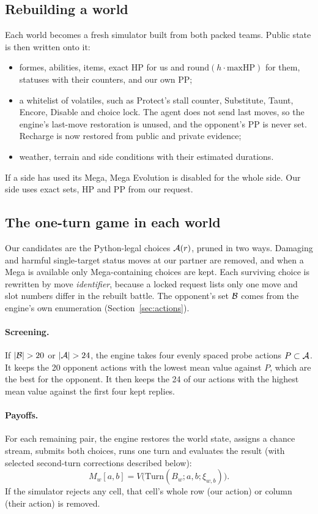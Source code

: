 \subsection{Rebuilding a world}
Each world becomes a fresh simulator  built from both packed
teams. Public state is then written onto it:
\begin{itemize}
  \item formes, abilities, items, exact HP for us and $\mathrm{round}(h\cdot
    \mathrm{maxHP})$ for them, statuses with their counters, and our own PP;
  \item a whitelist of volatiles, such as Protect's stall counter, Substitute,
    Taunt, Encore, Disable and choice lock. The agent does not send last
    moves, so the engine's last-move restoration is unused, and the opponent's
    PP is never set. Recharge is now restored from public and private evidence;
  \item weather, terrain and side conditions with their estimated durations.
\end{itemize}
If a side has used its Mega, Mega Evolution is disabled for the whole side.
Our side uses exact sets, HP and PP from our request.

\subsection{The one-turn game in each world}
Our candidates are the Python-legal choices $\mathcal{A}(r)$, pruned in two ways.
Damaging and harmful single-target status moves at our partner are removed, and when a Mega is available only
Mega-containing choices are kept. Each surviving choice is rewritten by move
\emph{identifier}, because a locked request lists only one move and slot
numbers differ in the rebuilt battle. The opponent's set $\mathcal{B}$ comes from the
engine's own enumeration (Section~\ref{sec:actions}).

\paragraph{Screening.} If $|\B|>20$ or $|\A|>24$, the engine takes four
evenly spaced probe actions $P\subset\mathcal{A}$. It keeps the 20 opponent actions
with the lowest mean value against $P$, which are the best for the opponent.
It then keeps the 24 of our actions with the highest mean value against the
first four kept replies.

\paragraph{Payoffs.} For each remaining pair, the engine restores the world
state, assigns a chance stream, submits both choices, runs one turn and
evaluates the result (with selected second-turn corrections described below):
\begin{equation}
  M_w[a,b]=V\big(\mathrm{Turn}(B_w;a,b;\xi_{w,b})\big).
\end{equation}
If the simulator rejects any cell, that cell's whole row (our action) or
column (their action) is removed.


